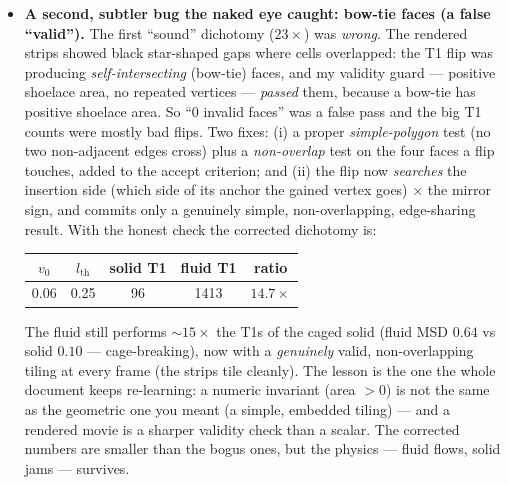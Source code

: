 \documentclass[11pt]{article}
\begin{document}
\begin{itemize}
stays \emph{differentiable} (no \texttt{scipy} solver; the rollout must remain differentiable for
inverse modelling). With that, the sheet stays stable and T1s fire.
\item \textbf{A second, subtler bug the naked eye caught: bow-tie faces (a false ``valid'').} The
first ``sound'' dichotomy ($23\times$) was \emph{wrong}. The rendered strips showed black star-shaped
gaps where cells overlapped: the T1 flip was producing \emph{self-intersecting} (bow-tie) faces,
and my validity guard --- positive shoelace area, no repeated vertices --- \emph{passed} them,
because a bow-tie has positive shoelace area. So ``$0$ invalid faces'' was a false pass and the
big T1 counts were mostly bad flips. Two fixes: (i) a proper \emph{simple-polygon} test (no two
non-adjacent edges cross) plus a \emph{non-overlap} test on the four faces a flip touches, added to
the accept criterion; and (ii) the flip now \emph{searches} the insertion side (which side of its
anchor the gained vertex goes) $\times$ the mirror sign, and commits only a genuinely simple,
non-overlapping, edge-sharing result. With the honest check the corrected dichotomy is:
\begin{center}\small
\begin{tabular}{ccccc}
\toprule
$v_0$ & $l_{\text{th}}$ & solid T1 & fluid T1 & ratio \\
\midrule
0.06 & 0.25 & 96 & 1413 & $\mathbf{14.7\times}$ \\
\bottomrule
\end{tabular}
\end{center}
The fluid still performs $\sim\!15\times$ the T1s of the caged solid (fluid MSD $0.64$ vs solid
$0.10$ --- cage-breaking), now with a \emph{genuinely} valid, non-overlapping tiling at every frame
(the strips tile cleanly). The lesson is the one the whole document keeps re-learning: a numeric
invariant (area $>0$) is not the same as the geometric one you meant (a simple, embedded tiling) ---
and a rendered movie is a sharper validity check than a scalar. The corrected numbers are smaller
than the bogus ones, but the physics --- fluid flows, solid jams --- survives.
\end{itemize}
\end{document}
